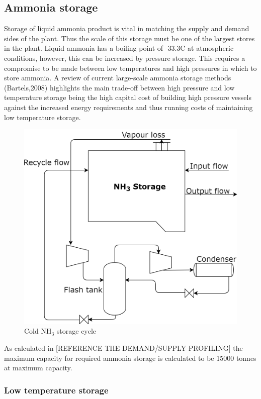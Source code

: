 \documentclass[11pt, a4paper]{article}
\begin{document}
{\subsection{Ammonia storage}
\label{subsec:JRstorage}
Storage of liquid ammonia product is vital in matching the supply and demand sides of the plant. Thus the scale of this storage must be one of the largest stores in the plant. Liquid ammonia has a boiling point of -33.3\textdegree C at atmospheric conditions, however, this can be increased by pressure storage. This requires a compromise to be made between low temperatures and high pressures in which to store ammonia. A review of current large-scale ammonia storage methods (Bartels,2008)\cite{Bartels2008} highlights the main trade-off between high pressure and low temperature storage being the high capital cost of building high pressure vessels against the increased energy requirements and thus running costs of maintaining low temperature storage.
\begin{figure}
	\centering
	\includegraphics[scale=0.215]{AmmStoreP}
	\caption{Cold NH$_3$ storage cycle}
\end{figure}
 As calculated in [REFERENCE THE DEMAND/SUPPLY PROFILING] the maximum capacity for required ammonia storage is calculated to be 15000 tonnes at maximum capacity.

\subsubsection{Low temperature storage}

}
\end{document}
